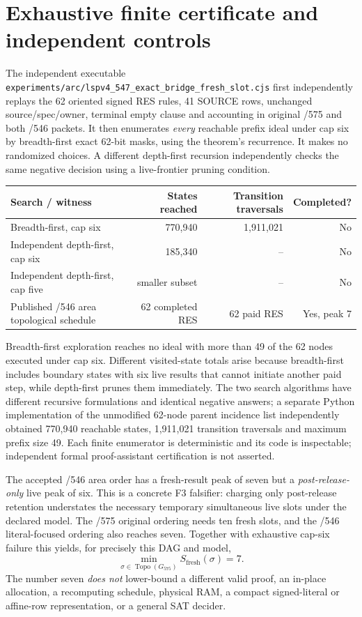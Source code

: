 \documentclass[11pt]{article}
\begin{document}
\section*{Exhaustive finite certificate and independent controls}
The independent executable \texttt{experiments/arc/lspv4\_547\_exact\_bridge\_fresh\_slot.cjs} first independently replays the 62 oriented signed RES rules, 41 SOURCE rows, unchanged source/spec/owner, terminal empty clause and accounting in original /575 and both /546 packets. It then enumerates \emph{every} reachable prefix ideal under cap six by breadth-first exact 62-bit masks, using the theorem's recurrence. It makes no randomized choices. A different depth-first recursion independently checks the same negative decision using a live-frontier pruning condition.

\begin{center}
\begin{tabular}{lrrr}
\toprule
Search / witness & States reached & Transition traversals & Completed?\\
\midrule
Breadth-first, cap six & 770,940 & 1,911,021 & No\\
Independent depth-first, cap six & 185,340 & -- & No\\
Independent depth-first, cap five & smaller subset & -- & No\\
Published /546 area topological schedule & 62 completed RES & 62 paid RES & Yes, peak 7\\
\bottomrule
\end{tabular}
\end{center}
Breadth-first exploration reaches no ideal with more than 49 of the 62 nodes executed under cap six. Different visited-state totals arise because breadth-first includes boundary states with six live results that cannot initiate another paid step, while depth-first prunes them immediately. The two search algorithms have different recursive formulations and identical negative answers; a separate Python implementation of the unmodified 62-node parent incidence list independently obtained 770,940 reachable states, 1,911,021 transition traversals and maximum prefix size 49. Each finite enumerator is deterministic and its code is inspectable; independent formal proof-assistant certification is not asserted.

The accepted /546 area order has a fresh-result peak of seven but a \emph{post-release-only} live peak of six. This is a concrete F3 falsifier: charging only post-release retention understates the necessary temporary simultaneous live slots under the declared model. The /575 original ordering needs ten fresh slots, and the /546 literal-focused ordering also reaches seven. Together with exhaustive cap-six failure this yields, for precisely this DAG and model,
\[
\boxed{\min_{\sigma\in\operatorname{Topo}(G_{575})}
S_{\mathrm{fresh}}(\sigma)=7.}
\]
The number seven \emph{does not} lower-bound a different valid proof, an in-place allocation, a recomputing schedule, physical RAM, a compact signed-literal or affine-row representation, or a general SAT decider.
\end{document}
